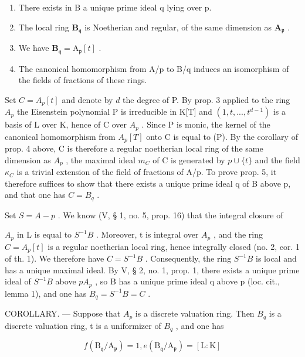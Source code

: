 \begin{enumerate}
\def\labelenumi{\alph{enumi})}
\item
  There exists in B a unique prime ideal q lying over p.
\item
  The local ring \(\mathbf{B}_{\mathfrak{q}}\) is Noetherian and regular, of the same dimension as \(\mathbf{A}_{\mathfrak{p}}\) .
\item
  We have \(\mathbf{B}_{\mathfrak{q}} = \mathrm{A}_{\mathfrak{p}}[t]\) .
\item
  The canonical homomorphism from A/p to B/q induces an isomorphism of the fields of fractions of these rings.
\end{enumerate}

Set \(C = A_{p}[t]\) and denote by \(d\) the degree of P. By prop. 3 applied to the ring \(A_{p}\) the Eisenstein polynomial P is irreducible in K{[}T{]} and \((1, t, ..., t^{d-1})\) is a basis of L over K, hence of C over \(A_{p}\) . Since P is monic, the kernel of the canonical homomorphism from \(A_{p}[T]\) onto C is equal to (P). By the corollary of prop. 4 above, C is therefore a regular noetherian local ring of the same dimension as \(A_{p}\) , the maximal ideal \(m_{C}\) of C is generated by \(p \cup \{t\}\) and the field \(\kappa_{C}\) is a trivial extension of the field of fractions of A/p. To prove prop. 5, it therefore suffices to show that there exists a unique prime ideal q of B above p, and that one has \(C = B_{q}\) .

Set \(S = A - p\) . We know (V, § 1, no. 5, prop. 16) that the integral closure of

\(A_{p}\) in L is equal to \(S^{-1}B\) . Moreover, t is integral over \(A_{p}\) , and the ring \(C = A_{p}[t]\) is a regular noetherian local ring, hence integrally closed (no. 2, cor. 1 of th. 1). We therefore have \(C = S^{-1}B\) . Consequently, the ring \(S^{-1}B\) is local and has a unique maximal ideal. By V, § 2, no. 1, prop. 1, there exists a unique prime ideal of \(S^{-1}B\) above \(pA_{p}\) , so B has a unique prime ideal q above p (loc. cit., lemma 1), and one has \(B_{q} = S^{-1}B = C\) .

COROLLARY. --- Suppose that \(A_{p}\) is a discrete valuation ring. Then \(B_{q}\) is a discrete valuation ring, t is a uniformizer of \(B_{q}\) , and one has

\[
f (\mathrm{B} _ {\mathfrak {q}} / \mathrm{A} _ {\mathfrak {p}}) = 1, e (\mathrm{B} _ {\mathfrak {q}} / \mathrm{A} _ {\mathfrak {p}}) = [ \mathrm{L}: \mathrm{K} ]\tag{9}
\]

